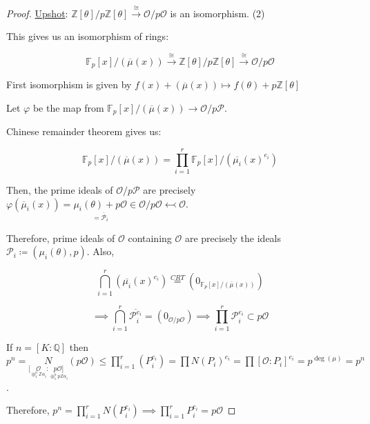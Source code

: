 \documentclass[openany]{amsbook}
\numberwithin{section}{chapter}
\theoremstyle{definition}
\begin{document}
\begin{proof}
    \underline{Upshot}: \(\mathbb{Z} [\theta] / p \mathbb{Z} [\theta] \overset{\cong}{\to} \mathcal{O} / p\mathcal{O}\) is an isomorphism. (2)

    This gives us an isomorphism of rings:

    \[
        \mathbb{F}_p[x] / (\overline{\mu} (x)) \overset{\cong}{\to} \mathbb{Z}[\theta] / p \mathbb{Z} [\theta] \overset{\cong}{\to} \mathcal{O} / p\mathcal{O}
    \]

    First isomorphism is given by \(f(x) + (\overline{\mu }(x)) \mapsto f(\theta) + p \mathbb{Z} [\theta]\) 

    Let \(\varphi\) be the map from \(\mathbb{F}_p[x]/(\overline{\mu } (x)) \to \mathcal{O} / p \mathcal{P}\). 


    Chinese remainder theorem gives us:

    \[
        \mathbb{F}_p[x]/(\overline{\mu} (x)) = \prod_{i=1}^r \mathbb{F}_p[x] / (\overline{\mu_i}(x)^{e_i} )
    \]

    Then, the prime ideals of \(\mathcal{O} / p \mathcal{P}\) are precisely \(\varphi(\overline{\mu}_i(x)) = \underset{=\overline{\mathcal{P}}_i}{\mu_i(\theta)+p \mathcal{O}} \in \mathcal{O}/ p \mathcal{O} \leftarrowtail \mathcal{O}\).

    Therefore, prime ideals of \(\mathcal{O}\) containing \(\mathcal{O}\) are precisely the ideals \(\mathcal{P}_i \coloneqq (\mu_i(\theta),p)\). Also, 

    \[
        \bigcap_{i=1}^{r} (\overline{\mu_i}(x)^{e_i}) \overset{CRT}{=} (0_{\mathbb{F}_p[x] / (\overline{\mu}(x))})
    \]

    \[
        \implies \bigcap_{i=1}^{r} \overline{\mathcal{P}_i^{e_i}} = (0_{\mathcal{O} / p \mathcal{O}}) \implies \prod_{i=1}^{r} \mathcal{P}_i^{e_i} \subset p \mathcal{O}
    \]

    If \(n = [K : \mathbb{Q}]\) then \(p^n = \underset{[\underset{\oplus_1^n \mathbb{Z} \alpha_i}{\mathcal{O}} : \underset{\oplus_1^n p \mathbb{Z} \alpha_i}{p \mathcal{O} ]}}N(p\mathcal{O}) \leq \prod_{i=1}^r (P_i^{e_i}) = \prod N(P_i)^{e_i} = \prod [\mathcal{O} : P_i]^{e_i} = p^{\deg(\mu)} = p^n\). 
    
    Therefore, \(p^n = \prod_{i=1}^{r} N(P_i^{e_i}) \implies \boxed{\prod_{i=1}^r P_i^{e_i} = p \mathcal{O}}\) 

\end{proof}
\end{document}
